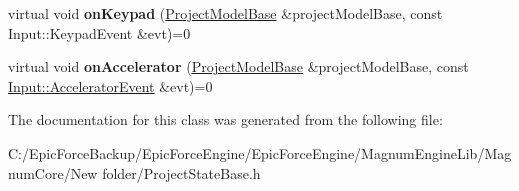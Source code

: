 \begin{DoxyCompactItemize}
\item 
virtual void {\bfseries on\+Keypad} (\hyperlink{class_epic_force_1_1_project_model_base}{Project\+Model\+Base} \&project\+Model\+Base, const Input\+::\+Keypad\+Event \&evt)=0\hypertarget{class_epic_force_1_1_state_base_a44e9c8e5864ab7d54274e1f39d7aaaa5}{}\label{class_epic_force_1_1_state_base_a44e9c8e5864ab7d54274e1f39d7aaaa5}

\item 
virtual void {\bfseries on\+Accelerator} (\hyperlink{class_epic_force_1_1_project_model_base}{Project\+Model\+Base} \&project\+Model\+Base, const \hyperlink{class_magnum_1_1_input_1_1_accelerator_event}{Input\+::\+Accelerator\+Event} \&evt)=0\hypertarget{class_epic_force_1_1_state_base_ae991076474c8a23500077c216e664106}{}\label{class_epic_force_1_1_state_base_ae991076474c8a23500077c216e664106}

\end{DoxyCompactItemize}


The documentation for this class was generated from the following file\+:\begin{DoxyCompactItemize}
\item 
C\+:/\+Epic\+Force\+Backup/\+Epic\+Force\+Engine/\+Epic\+Force\+Engine/\+Magnum\+Engine\+Lib/\+Magnum\+Core/\+New folder/Project\+State\+Base.\+h\end{DoxyCompactItemize}
